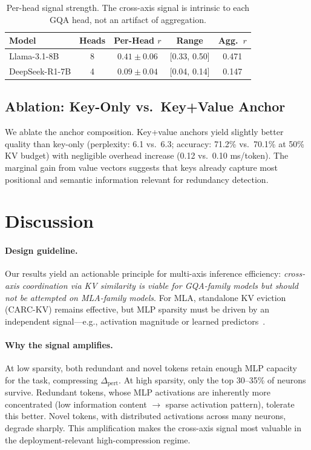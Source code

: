 \documentclass[11pt,a4paper]{article}
\begin{document}
\begin{table}[t]
\centering
\small
\begin{tabular}{lcccc}
\toprule
\textbf{Model} & \textbf{Heads} & \textbf{Per-Head $r$} & \textbf{Range} & \textbf{Agg.\ $r$} \\
\midrule
Llama-3.1-8B    & 8 & $0.41 \pm 0.06$ & [0.33, 0.50] & 0.471 \\
DeepSeek-R1-7B & 4 & $0.09 \pm 0.04$ & [0.04, 0.14] & 0.147 \\
\bottomrule
\end{tabular}
\caption{Per-head signal strength. The cross-axis signal is intrinsic to each GQA head, not an artifact of aggregation.}
\label{tab:per-head}
\end{table}

\subsection{Ablation: Key-Only vs.\ Key+Value Anchor}
\label{sec:ablation}

We ablate the anchor composition.
Key+value anchors yield slightly better quality than key-only (perplexity: 6.1 vs.\ 6.3; accuracy: 71.2\% vs.\ 70.1\% at 50\% KV budget) with negligible overhead increase (0.12 vs.\ 0.10 ms/token).
The marginal gain from value vectors suggests that keys already capture most positional and semantic information relevant for redundancy detection.

\section{Discussion}
\label{sec:discussion}

\paragraph{Design guideline.}
Our results yield an actionable principle for multi-axis inference efficiency: \emph{cross-axis coordination via KV similarity is viable for GQA-family models but should not be attempted on MLA-family models}.
For MLA, standalone KV eviction (CARC-KV) remains effective, but MLP sparsity must be driven by an independent signal---e.g., activation magnitude or learned predictors~\cite{liu2023dejavu}.

\paragraph{Why the signal amplifies.}
At low sparsity, both redundant and novel tokens retain enough MLP capacity for the task, compressing $\Delta_\text{pert}$.
At high sparsity, only the top 30--35\% of neurons survive.
Redundant tokens, whose MLP activations are inherently more concentrated (low information content $\rightarrow$ sparse activation pattern), tolerate this better.
Novel tokens, with distributed activations across many neurons, degrade sharply.
This amplification makes the cross-axis signal most valuable in the deployment-relevant high-compression regime.
\end{document}

